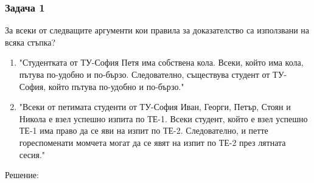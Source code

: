 \documentclass[fleqn, 12pt]{article}
\theoremstyle{definition}
\begin{document}
\subsubsection*{Задача 1}
За  всеки  от  следващите  аргументи  кои  правила  за  доказателство  са използвани на всяка стъпка?
\begin{enumerate}
\item "Студентката от ТУ-София Петя има собствена кола. Всеки, който има кола, пътува по-удобно и по-бързо. Следователно, съществува студент от ТУ-София, който пътува по-удобно и по-бързо."
\item "Всеки от петимата студенти от ТУ-София Иван, Георги, Петър, Стоян и Никола е взел успешно изпита по ТЕ-1.  Всеки студент, който е взел успешно ТЕ-1 има право да се яви на изпит по ТЕ-2. Следователно, и петте гореспоменати момчета могат да се явят на изпит по ТЕ-2 през лятната сесия."
\end{enumerate}
Решение:
\end{document}
